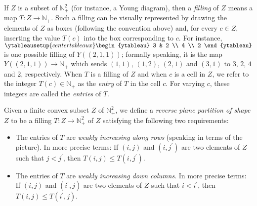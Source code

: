 \documentclass[numbers=enddot,12pt,final,onecolumn,notitlepage]{scrartcl}%
\theoremstyle{definition}
\begin{document}
If $Z$ is a subset of $\mathbb{N}_{+}^{2}$ (for instance, a Young diagram),
then a \textit{filling} of $Z$ means a map $T:Z\rightarrow\mathbb{N}_{+}$.
Such a filling can be visually represented by drawing the elements of $Z$ as
boxes (following the convention above) and, for every $c\in Z$, inserting the
value $T\left(  c\right)  $ into the box corresponding to $c$. For instance, $%
\ytableausetup{centertableaux}
\begin{ytableau}
3 & 2 \\
4 \\
2
\end{ytableau}%
$ is one possible filling of $Y\left(  \left(  2,1,1\right)  \right)  $;
formally speaking, it is the map $Y\left(  \left(  2,1,1\right)  \right)
\rightarrow\mathbb{N}_{+}$ which sends $\left(  1,1\right)  $, $\left(
1,2\right)  $, $\left(  2,1\right)  $ and $\left(  3,1\right)  $ to $3$, $2$,
$4$ and $2$, respectively. When $T$ is a filling of $Z$ and when $c$ is a cell
in $Z$, we refer to the integer $T\left(  c\right)  \in\mathbb{N}_{+}$ as the
\textit{entry} of $T$ in the cell $c$. For varying $c$, these integers are
called the \textit{entries} of $T$.

Given a finite convex subset $Z$ of $\mathbb{N}_{+}^{2}$, we define a
\textit{reverse plane partition of shape }$Z$ to be a filling $T:Z\rightarrow
\mathbb{N}_{+}^{2}$ of $Z$ satisfying the following two requirements:

\begin{itemize}
\item The entries of $T$ are \textit{weakly increasing along rows} (speaking
in terms of the picture). In more precise terms: If $\left(  i,j\right)  $ and
$\left(  i,j^{\prime}\right)  $ are two elements of $Z$ such that
$j<j^{\prime}$, then $T\left(  i,j\right)  \leq T\left(  i,j^{\prime}\right)
$.

\item The entries of $T$ are \textit{weakly increasing down columns}. In more
precise terms: If $\left(  i,j\right)  $ and $\left(  i^{\prime},j\right)  $
are two elements of $Z$ such that $i<i^{\prime}$, then $T\left(  i,j\right)
\leq T\left(  i^{\prime},j\right)  $.
\end{itemize}
\end{document}
